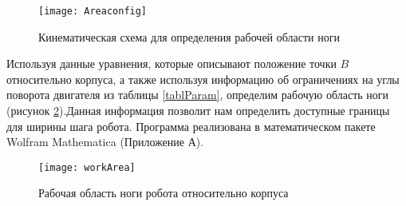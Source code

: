 \begin{figure}[h]
	\begin{center}
		\texttt{[image: Areaconfig]}
		\caption{Кинематическая схема для определения рабочей области ноги}
		\label{Areaconfig}
	\end{center}
\end{figure}

Используя данные уравнения, которые описывают положение точки $B$ относительно корпуса, а также используя информацию об ограничениях на углы поворота двигателя из таблицы \ref{tablParam}, определим рабочую область ноги (рисунок \ref{workArea}).Данная информация позволит нам определить доступные границы для ширины шага робота. Программа реализована в математическом пакете Wolfram Mathematica (Приложение А).
\newpage
\begin{figure}[h!]
	\begin{center}
		\texttt{[image: workArea]}
		\caption{Рабочая область ноги робота относительно корпуса}
		\label{workArea}
	\end{center}
\end{figure}

